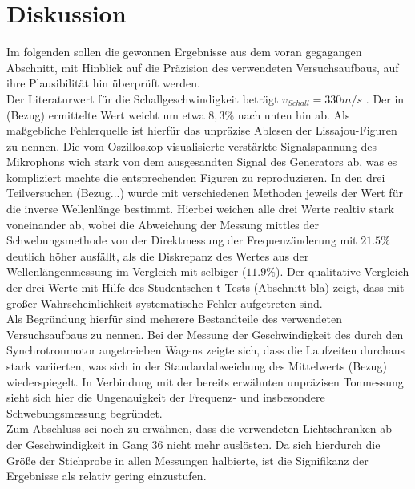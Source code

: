 \section{Diskussion}

Im folgenden sollen die gewonnen Ergebnisse aus dem voran gegagangen Abschnitt, mit Hinblick auf die Präzision
des verwendeten Versuchsaufbaus, auf ihre Plausibilität hin überprüft werden.  \\
Der Literaturwert für die Schallgeschwindigkeit beträgt $v_{Schall} = 330 m/s$ \cite{numpy}. Der in (Bezug) ermittelte Wert weicht
um etwa $8,3 \% $ nach unten hin ab. Als maßgebliche Fehlerquelle ist hierfür das unpräzise Ablesen der Lissajou-Figuren zu nennen. Die
vom Oszilloskop visualisierte verstärkte Signalspannung des Mikrophons wich stark von dem ausgesandten Signal des Generators ab, was es kompliziert
machte die entsprechenden Figuren zu reproduzieren.
In den drei Teilversuchen (Bezug...) wurde mit verschiedenen Methoden jeweils der Wert für die inverse Wellenlänge bestimmt. Hierbei weichen alle drei Werte realtiv stark
voneinander ab, wobei die Abweichung der Messung mittles der Schwebungsmethode von der Direktmessung der Frequenzänderung mit $21.5 \%$ deutlich höher ausfällt,
als die Diskrepanz des Wertes aus der Wellenlängenmessung im Vergleich mit selbiger ($11.9 \% $). Der qualitative Vergleich der drei Werte mit Hilfe des Studentschen t-Tests
(Abschnitt bla) zeigt, dass mit großer Wahrscheinlichkeit systematische Fehler aufgetreten sind. \\
Als Begründung hierfür sind meherere Bestandteile des verwendeten Versuchsaufbaus zu nennen.
Bei der Messung der Geschwindigkeit des durch den Synchrotronmotor angetreieben Wagens zeigte sich, dass die Laufzeiten
durchaus stark variierten, was sich in der Standardabweichung des Mittelwerts (Bezug) wiederspiegelt. In Verbindung mit der bereits erwähnten
unpräzisen Tonmessung sieht sich hier die Ungenauigkeit der Frequenz- und insbesondere Schwebungsmessung begründet. \\
Zum Abschluss sei noch zu erwähnen, dass die verwendeten Lichtschranken ab der Geschwindigkeit in Gang 36 nicht mehr auslösten. Da sich hierdurch
die Größe der Stichprobe in allen Messungen halbierte, ist die Signifikanz der Ergebnisse als relativ gering einzustufen.
